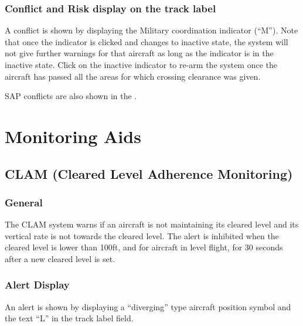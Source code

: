 \documentclass[a4paper,oneside,11pt]{memoir}
\begin{document}
\subsubsection*{Conflict and Risk display on the track label}

A conflict is shown by displaying the Military coordination indicator (“M”). Note that once the indicator is clicked and changes to inactive state, the system will not give further warnings for that aircraft as long as the indicator is in the inactive state. Click on the inactive indicator to re-arm the system once the aircraft has passed all the areas for which crossing clearance was given.

\bigskip

SAP conflicts are also shown in the .

\section{Monitoring Aids}



\subsection{CLAM (Cleared Level Adherence Monitoring)}
\label{tool:CLAM}
\subsubsection*{General}

The CLAM system warns if an aircraft is not maintaining its cleared level and its vertical rate is not towards the cleared level. The alert is inhibited when the cleared level is lower than 100ft, and for aircraft in level flight, for 30 seconds after a new cleared level is set.

\subsubsection*{Alert Display}

An alert is shown by displaying a “diverging” type aircraft position symbol and the text “L” in the  track label field.
\end{document}
